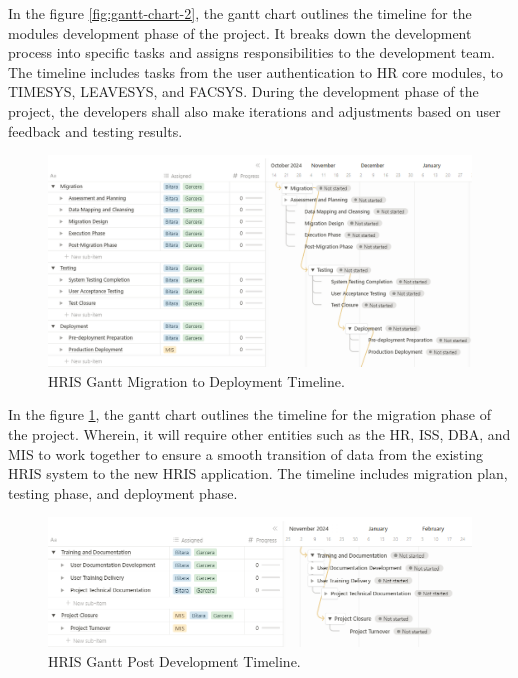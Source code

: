     In the figure \ref{fig:gantt-chart-2}, the gantt chart outlines the timeline for the modules development phase of the project. It breaks down the development process into specific tasks and assigns responsibilities to the development team. The timeline includes tasks from the user authentication to HR core modules, to TIMESYS, LEAVESYS, and FACSYS. During the development phase of the project, the developers shall also make iterations and adjustments based on user feedback and testing results.

    \begin{figure}[H]
        \centering
        \includegraphics[width=1\linewidth]{figures/images/diagrams/gantt/gantt-chart-3.png}
        \caption{HRIS Gantt Migration to Deployment Timeline.}
        \label{fig:gantt-chart-3}
    \end{figure}

    In the figure \ref{fig:gantt-chart-3}, the gantt chart outlines the timeline for the migration phase of the project. Wherein, it will require other entities such as the HR, ISS, DBA, and MIS to work together to ensure a smooth transition of data from the existing HRIS system to the new HRIS application. The timeline includes migration plan, testing phase, and deployment phase.

    \begin{figure}[H]
        \centering
        \includegraphics[width=1\linewidth]{figures/images/diagrams/gantt/gantt-chart-4.png}
        \caption{HRIS Gantt Post Development Timeline.}
        \label{fig:gantt-chart-4}
    \end{figure}

